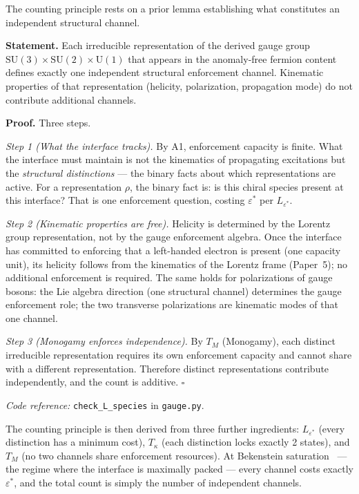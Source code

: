 \documentclass[11pt]{article}
\newcommand{\coderef}[2]{\smallskip\noindent\textit{Code reference:} \texttt{#1} in \texttt{#2}.}
\newcommand{\SU}{\mathrm{SU}}
\newcommand{\U}{\mathrm{U}}
\begin{document}
The counting principle rests on a prior lemma establishing what constitutes an independent structural channel.

\begin{tcolorbox}[apfbox, title={Lemma $L_{\mathrm{species}}$ (Species as Enforcement Channels)}]
\textbf{Statement.}  Each irreducible representation of the derived gauge group $\SU(3) \times \SU(2) \times \U(1)$ that appears in the anomaly-free fermion content defines exactly one independent structural enforcement channel.  Kinematic properties of that representation (helicity, polarization, propagation mode) do not contribute additional channels.

\smallskip\noindent\textbf{Proof.}  Three steps.

\textit{Step 1 (What the interface tracks).}  By A1, enforcement capacity is finite.  What the interface must maintain is not the kinematics of propagating excitations but the \emph{structural distinctions} --- the binary facts about which representations are active.  For a representation $\rho$, the binary fact is: is this chiral species present at this interface?  That is one enforcement question, costing $\varepsilon^*$ per $L_{\varepsilon^*}$.

\textit{Step 2 (Kinematic properties are free).}  Helicity is determined by the Lorentz group representation, not by the gauge enforcement algebra.  Once the interface has committed to enforcing that a left-handed electron is present (one capacity unit), its helicity follows from the kinematics of the Lorentz frame (Paper~5); no additional enforcement is required.  The same holds for polarizations of gauge bosons: the Lie algebra direction (one structural channel) determines the gauge enforcement role; the two transverse polarizations are kinematic modes of that one channel.

\textit{Step 3 (Monogamy enforces independence).}  By $T_M$ (Monogamy), each distinct irreducible representation requires its own enforcement capacity and cannot share with a different representation.  Therefore distinct representations contribute independently, and the count is additive.  $\square$

\coderef{check\_L\_species}{gauge.py}
\end{tcolorbox}

The counting principle is then derived from three further ingredients: $L_{\varepsilon^*}$ (every distinction has a minimum cost), $T_\kappa$ (each distinction locks exactly 2 states), and $T_M$ (no two channels share enforcement resources).  At Bekenstein saturation~\cite{Bekenstein1973} --- the regime where the interface is maximally packed --- every channel costs exactly $\varepsilon^*$, and the total count is simply the number of independent channels.
\end{document}
